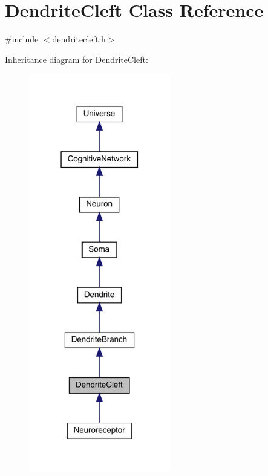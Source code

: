 \hypertarget{class_dendrite_cleft}{}\section{Dendrite\+Cleft Class Reference}
\label{class_dendrite_cleft}


{\ttfamily \#include $<$dendritecleft.\+h$>$}



Inheritance diagram for Dendrite\+Cleft\+:\nopagebreak
\begin{figure}[H]
\begin{center}
\leavevmode
\includegraphics[width=175pt]{class_dendrite_cleft__inherit__graph}
\end{center}
\end{figure}


